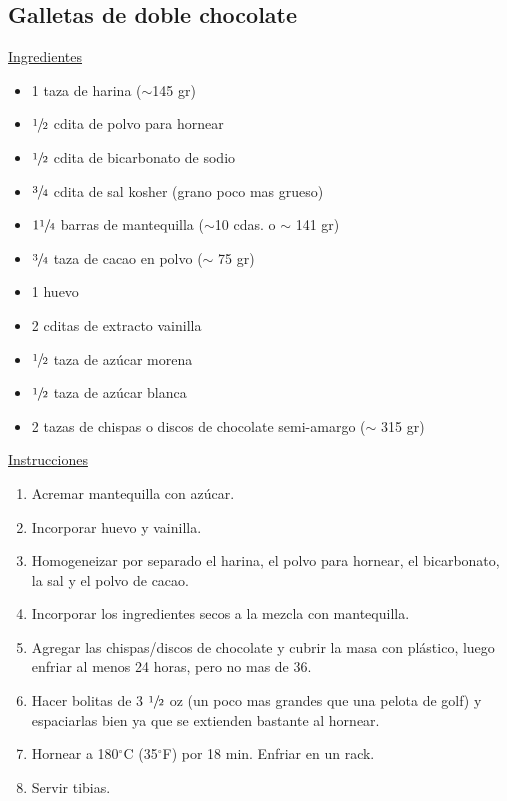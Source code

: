 \subsection{Galletas de doble chocolate}
\underline{Ingredientes}
\begin{itemize}
\item 1 taza de harina ($\sim$145 gr)
\item $\sfrac{1}{2}$ cdita de polvo para hornear
\item $\sfrac{1}{2}$ cdita de bicarbonato de sodio
\item $\sfrac{3}{4}$ cdita de sal kosher (grano poco mas grueso) 
\item $1\sfrac{1}{4}$ barras de mantequilla ($\sim$10 cdas. o $\sim$ 141 gr)
\item $\sfrac{3}{4}$ taza de cacao en polvo ($\sim$ 75 gr)
\item 1 huevo
\item 2 cditas de extracto vainilla
\item $\sfrac{1}{2}$ taza de az\'ucar morena 
\item $\sfrac{1}{2}$ taza de az\'ucar blanca 
\item 2 tazas de chispas o discos de chocolate semi-amargo ($\sim$ 315 gr)
\end{itemize}

\underline{Instrucciones}

\begin{enumerate}
\item Acremar mantequilla con az\'ucar. 
\item Incorporar huevo y vainilla.
\item Homogeneizar por separado el harina, el polvo para hornear, el bicarbonato, la sal y el polvo de cacao.
\item Incorporar los ingredientes secos a la mezcla con mantequilla.
\item Agregar las chispas/discos de chocolate y cubrir la masa con pl\'astico, luego enfriar al menos 24 horas, pero no mas de 36.
\item Hacer bolitas de 3 $\sfrac{1}{2}$ oz (un poco mas grandes que una pelota de golf) y espaciarlas bien ya que se extienden bastante al hornear. 
\item Hornear a 180$^\circ $C (35$^\circ $F) por 18 min. Enfriar en un rack.
\item Servir tibias.
\end{enumerate}
